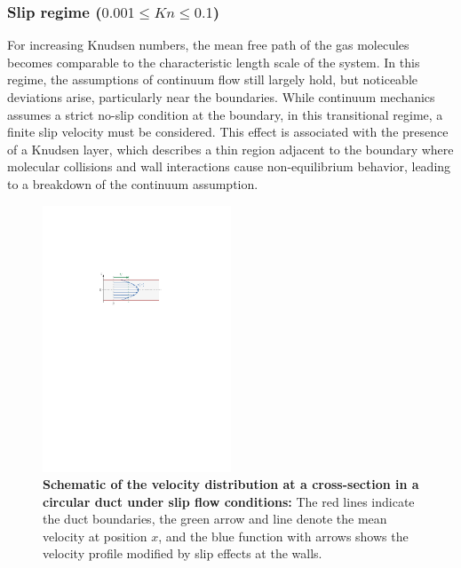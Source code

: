 \subsubsection*{Slip regime ($0.001 \leq Kn \leq 0.1$)}
	For increasing Knudsen numbers, the mean free path of the gas molecules becomes comparable to the characteristic length scale of the system.
	In this regime, the assumptions of continuum flow still largely hold, but noticeable deviations arise, particularly near the boundaries.
	While continuum mechanics assumes a strict no-slip condition at the boundary, in this transitional regime, a finite slip velocity must be considered.
	This effect is associated with the presence of a Knudsen layer, which describes a thin region adjacent to the boundary where molecular collisions and wall interactions cause non-equilibrium behavior, leading to a breakdown of the continuum assumption.
	\begin{figure}[H]
	    \centering
	    \includegraphics[width=0.5\textwidth]{src/02_foundations/fig_slip-regime.pdf}
		\caption[Schematic of the velocity distribution at a cross-section in a circular duct under slip flow conditions.]{
			\textbf{Schematic of the velocity distribution at a cross-section in a circular duct under slip flow conditions:}
			The red lines indicate the duct boundaries, the green arrow and line denote the mean velocity at position $x$, and the blue function with arrows shows the velocity profile modified by slip effects at the walls. \cite{Cengel2017}
		}
		\label{fig:slip-flow}
	\end{figure}

